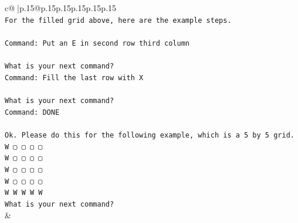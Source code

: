 \documentclass{article}
\begin{document}
{\begin{supertabular}{c@{$\;$}|p{.15\linewidth}@{}p{.15\linewidth}p{.15\linewidth}p{.15\linewidth}p{.15\linewidth}p{.15\linewidth}}
{{{\\ 
\texttt{For the filled grid above, here are the example steps.} \\
\\ 
\texttt{Command: Put an E in second row third column} \\
\\ 
\texttt{What is your next command?} \\
\texttt{Command: Fill the last row with X} \\
\\ 
\texttt{What is your next command?} \\
\texttt{Command: DONE} \\
\\ 
\texttt{Ok. Please do this for the following example, which is a 5 by 5 grid.} \\
\texttt{W ▢ ▢ ▢ ▢} \\
\texttt{W ▢ ▢ ▢ ▢} \\
\texttt{W ▢ ▢ ▢ ▢} \\
\texttt{W ▢ ▢ ▢ ▢} \\
\texttt{W W W W W} \\
\texttt{What is your next command?} \\
            }
        }
    }
    & \\ \\


\end{supertabular}}
\end{document}
